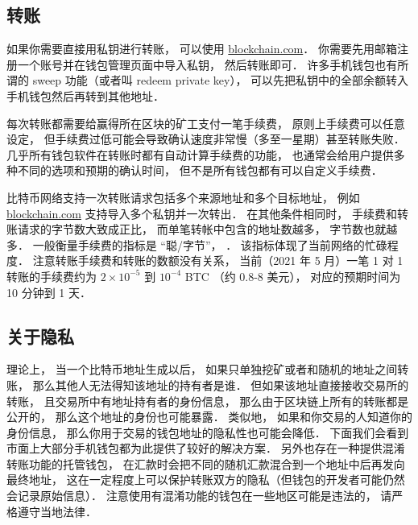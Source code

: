 \subsection{转账}
如果你需要直接用私钥进行转账， 可以使用 \href{https://blockchain.com}{blockchain.com}． 你需要先用邮箱注册一个账号并在钱包管理页面中导入私钥， 然后转账即可． 许多手机钱包也有所谓的 sweep 功能（或者叫 redeem private key）， 可以先把私钥中的全部余额转入手机钱包然后再转到其他地址．

每次转账都需要给赢得所在区块的矿工支付一笔手续费， 原则上手续费可以任意设定， 但手续费过低可能会导致确认速度非常慢（多至一星期）甚至转账失败． 几乎所有钱包软件在转账时都有自动计算手续费的功能， 也通常会给用户提供多种不同的选项和预期的确认时间， 但不是所有钱包都有可以自定义手续费．

比特币网络支持一次转账请求包括多个来源地址和多个目标地址， 例如 \href{https://blockchain.com}{blockchain.com} 支持导入多个私钥并一次转出． 在其他条件相同时， 手续费和转账请求的字节数大致成正比， 而单笔转帐中包含的地址数越多， 字节数也就越多． 一般衡量手续费的指标是 “聪/字节”， ． 该指标体现了当前网络的忙碌程度． 注意转账手续费和转账的数额没有关系， 当前（2021 年 5 月）一笔 1 对 1 转账的手续费约为 $2\times 10^{-5}$ 到 $10^{-4}$ BTC （约 0.8-8 美元）， 对应的预期时间为 10 分钟到 1 天．

\subsection{关于隐私}
理论上， 当一个比特币地址生成以后， 如果只单独挖矿或者和随机的地址之间转账， 那么其他人无法得知该地址的持有者是谁． 但如果该地址直接接收交易所的转账， 且交易所中有地址持有者的身份信息， 那么由于区块链上所有的转账都是公开的， 那么这个地址的身份也可能暴露． 类似地， 如果和你交易的人知道你的身份信息， 那么你用于交易的钱包地址的隐私性也可能会降低． 下面我们会看到市面上大部分手机钱包都为此提供了较好的解决方案． 另外也存在一种提供混淆转账功能的托管钱包， 在汇款时会把不同的随机汇款混合到一个地址中后再发向最终地址， 这在一定程度上可以保护转账双方的隐私（但钱包的开发者可能仍然会记录原始信息）． 注意使用有混淆功能的钱包在一些地区可能是违法的， 请严格遵守当地法律．

